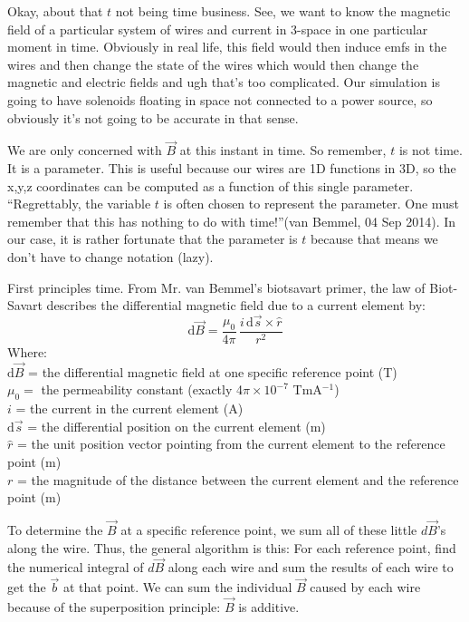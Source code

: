 \documentclass[12pt]{article}
\newcommand{\spaces}{\phantom{\qquad}}
\newcommand{\dif}{\mathrm{d}}
\begin{document}
	Okay, about that $t$ not being time business. See, we want to know the magnetic field of a particular system of wires and current in 3-space in one particular moment in time. Obviously in real life, this field would then induce emfs in the wires and then change the state of the wires which would then change the magnetic and electric fields and ugh that's too complicated. Our simulation is going to have solenoids floating in space not connected to a power source, so obviously it's not going to be accurate in that sense.
	
	We are only concerned with $\vec{B}$ at this instant in time. So remember, $t$ is not time. It is a parameter. This is useful because our wires are 1D functions in 3D, so the x,y,z coordinates can be computed as a function of this single parameter. ``Regrettably, the variable $t$ is often chosen to represent the parameter. One must remember that this has nothing to do with time!''(van Bemmel, 04 Sep 2014). In our case, it is rather fortunate that the parameter is $t$ because that means we don't have to change notation (lazy).
	
	First principles time. From Mr. van Bemmel's biotsavart primer, the law of Biot-Savart describes the differential magnetic field due to a current element by:	
			$$\dif \vec{B} = \frac{\mu_0}{4\pi} \, \frac{i\,\dif \vec{s} \times \hat{r}}{r^2}$$			
	Where: \\
		\spaces $\dif \vec{B}$ = the differential magnetic field at one specific reference point (T) \\
		\spaces $\mu_0 =$ the permeability constant (exactly 4$\pi \times 10^{-7}$ TmA$^{-1}$)\\		
		\spaces $i$ = the current in the current element (A) \\
		\spaces $\dif \vec{s}$ = the differential position on the current element (m) \\
		\spaces $\hat{r}$ = the unit position vector pointing from the current element to the reference point (m)\\
		\spaces $r$ = the magnitude of the distance between the current element and the reference point (m)
			
	To determine the $\vec{B}$ at a specific reference point, we sum all of these little $d\vec{B}$'s along the wire. Thus, the general algorithm is this: For each reference point, find the numerical integral of $d\vec{B}$ along each wire and sum the results of each wire to get the $\vec{b}$ at that point. We can sum the individual $\vec{B}$ caused by each wire because of the superposition principle: $\vec{B}$ is additive.
	
\end{document}
